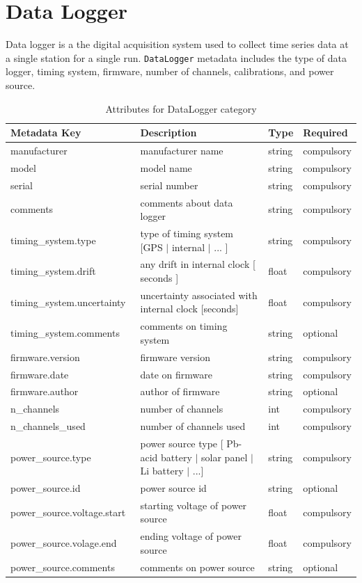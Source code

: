 \documentclass{article}
\begin{document}
\newpage
\section{Data Logger}

Data logger is a the digital acquisition system used to collect time series data at a single station for a single run.  \verb|DataLogger| metadata includes the type of data logger, timing system, firmware, number of channels, calibrations, and power source.

\begin{table}[htb!]
    \caption[Attributes for DataLogger]{Attributes for DataLogger category}
    \begin{tabular}{|l|p{3in}|l|l|}
        \hline
        \textbf{Metadata Key} & \textbf{Description} & \textbf{Type} & \textbf{Required} \\ \hline
        manufacturer\ & manufacturer name & string & compulsory \\ \hline
        model\ & model name & string & compulsory \\ \hline
        serial\ & serial number & string & compulsory \\ \hline
        comments\ & comments about data logger & string & compulsory \\ \hline
        timing\_system.type\ & type of timing system [GPS $|$ internal $|$ ... ] & string & compulsory \\ \hline
        timing\_system.drift\ & any drift in internal clock [ seconds ] & float & compulsory \\ \hline
        timing\_system.uncertainty\ & uncertainty associated with internal clock [seconds] & float & compulsory \\ \hline
        timing\_system.comments\ & comments on timing system & string & optional \\ \hline
        firmware.version\ & firmware version & string & compulsory \\ \hline
        firmware.date\ & date on firmware & string & compulsory \\ \hline
        firmware.author\ & author of firmware & string & optional \\ \hline
        n\_channels\ & number of channels & int & compulsory \\ \hline
        n\_channels\_used\ & number of channels used & int & compulsory \\ \hline
        power\_source.type\ & power source type [ Pb-acid battery $|$ solar panel $|$ Li battery $|$ ...] & string & compulsory \\ \hline
        power\_source.id\ & power source id & string & optional \\ \hline
        power\_source.voltage.start\ & starting voltage of power source & float & compulsory \\ \hline
        power\_source.volage.end\ & ending voltage of power source & float & compulsory \\ \hline
        power\_source.comments\ & comments on power source & string & optional \\ \hline
    \end{tabular}
    \label{tab:datalogger}
\end{table}    
\end{document}
